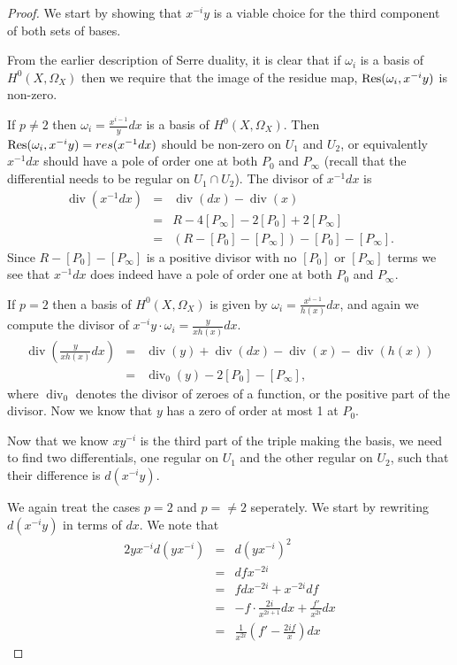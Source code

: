\documentclass[draft, 11pt]{article} %
\theoremstyle{plain}
\theoremstyle{remark}
\DeclareMathOperator{\di}{div}
\begin{document}
\begin{proof}

We start by showing that $x^{-i}y$ is a viable choice for the third component of both sets of bases.

From the earlier description of Serre duality, it is clear that if $\omega_i$ is a basis of $H^0(X, \Omega_X)$ then we require that the image of the residue map, ${\rm Res}(\omega_i, x^{-i}y)$ is non-zero.

If $p \neq 2$ then $\omega_i = \frac{x^{i-1}}{y}dx$ is a basis of $H^0(X, \Omega_X)$. 
Then ${\rm Res}(\omega_i, x^{-i}y) = res(x^{-1}dx)$ should be non-zero on $U_1$ and $U_2$, or equivalently $x^{-1}dx$ should have a pole of order one at both $P_0$ and $P_\infty$ (recall that the differential needs to be regular on $U_1 \cap U_2$).
The divisor of $x^{-1}dx$ is
\begin{eqnarray}
\di (x^{-1}dx) & = & \di(dx) - \di (x) \\
& = & R - 4[P_\infty] - 2[P_0] + 2[P_\infty] \\
& = & (R-[P_0]-[P_\infty]) - [P_0] - [P_\infty].
\end{eqnarray}
Since $R -[P_0]-[P_\infty]$ is a positive divisor with no $[P_0]$ or $[P_\infty]$ terms we see that $x^{-1}dx$ does indeed have a pole of order one at both $P_0$ and $P_\infty$.

If $p=2$ then a basis of $H^0(X,\Omega_X)$ is given by $\omega_i = \frac{x^{i-1}}{h(x)}dx$, and again we compute the divisor of $x^{-i}y\cdot \omega_i = \frac{y}{xh(x)}dx$.
\begin{eqnarray}
\di\left( \frac{y}{xh(x)}dx \right) & = & \di(y) + \di(dx) - \di(x) - \di(h(x)) \\
& = & \di_0(y) -2[P_0] -[P_\infty],
\end{eqnarray}
where $\di_0$ denotes the divisor of zeroes of a function, or the positive part of the divisor.
Now we know that $y$ has a zero of order at most 1 at $P_0$. 

Now that we know $xy^{-i}$ is the third part of the triple making the basis, we need to find two differentials, one regular on $U_1$ and the other regular on $U_2$, such that their difference is $d(x^{-i}y)$.

We again treat the cases $p=2$ and $p=\neq 2$ seperately.
We start by rewriting $d(x^{-i}y)$ in terms of $dx$.
We note that
\begin{eqnarray*}
2yx^{-i}d(yx^{-i}) & = & d(yx^{-i})^2 \\
& = & dfx^{-2i} \\
& = & fdx^{-2i} + x^{-2i}df \\
& = & -f\cdot\frac{2i}{x^{2i+1}}dx + \frac{f'}{x^{2i}}dx \\
& = & \frac{1}{x^{2i}}\left( f' - \frac{2if}{x}\right) dx 
\end{eqnarray*}


\end{proof}
\end{document}
